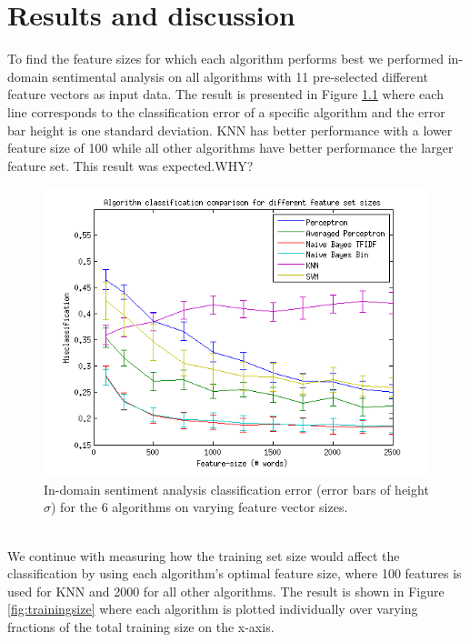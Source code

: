 \chapter{Results and discussion}
To find the feature sizes for which each algorithm performs best we performed in-domain sentimental analysis on all algorithms with 11 pre-selected different feature vectors as input data. The result is presented in Figure \ref{fig:featuresize} where each line corresponds to the classification error of a specific algorithm and the error bar height is one standard deviation. KNN has better performance with a lower feature size of 100 while all other algorithms have better performance the larger feature set. This result was expected.WHY?\\
\begin{figure}[h!]
\centering
\includegraphics[width=1\linewidth]{../Plottar/feature-size100-2500all.png}
\caption{In-domain sentiment analysis classification error (error bars of height $\sigma$) for the 6 algorithms on varying feature vector sizes.}
\label{fig:featuresize}
\end{figure}\\
We continue with measuring how the training set size would affect the classification by using each algorithm's optimal feature size, where 100 features is used for KNN and 2000 for all other algorithms. The result is shown in Figure \ref{fig:trainingsize} where each algorithm is plotted individually over varying fractions of the total training size on the x-axis.\\
